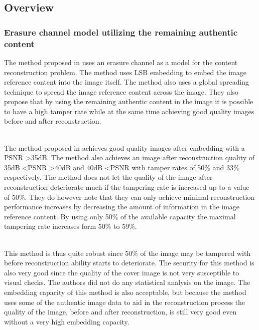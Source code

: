 \documentclass[12pt]{article}
\begin{document}
\subsection{Overview}

\subsubsection{Erasure channel model utilizing the remaining authentic content}
\label{ErasureChannelOverview}
The method proposed in \cite {korus2013efficient} uses an erasure channel as a model for the content reconstruction problem.
The method uses LSB embedding to embed the image reference content into the image itself.
The method also uses a global spreading technique to spread the image reference content across the image.
They also propose that by using the remaining authentic content in the image it is possible to have a high tamper rate while at the same time achieving good quality images before and after reconstruction.

\hspace{0pt} \\
The method proposed in \cite {korus2013efficient} achieves good quality images after embedding with a PSNR \textgreater 35dB. 
The method also achieves an image after reconstruction quality of 35dB \textless PSNR \textgreater 40dB and 40dB \textless PSNR with tamper rates of 50\% and 33\% respectively.
The method does not let the quality of the image after reconstruction deteriorate much if the tampering rate is increased up to a value of 50\%.
They do however note that they can only achieve minimal reconstruction performance increases by decreasing the amount of information in the image reference content.
By using only 50\% of the available capacity the maximal tampering rate increases form 50\% to 59\%.

\hspace{0pt} \\
This method \cite {korus2013efficient} is thus quite robust since 50\% of the image may be tampered with before reconstruction ability starts to deteriorate.
The security for this method is also very good since the quality of the cover image is not very susceptible to visual checks.
The authors did not do any statistical analysis on the image.
The embedding capacity of this method is also acceptable, but because the method uses some of the authentic image data to aid in the reconstruction process the quality of the image, before and after reconstruction, is still very good even without a very high embedding capacity.  
\end{document}
